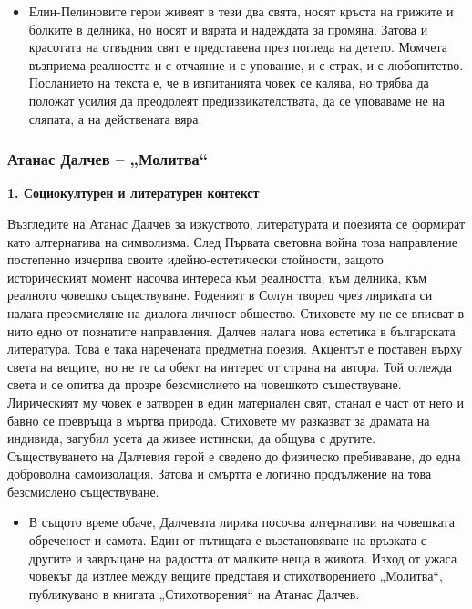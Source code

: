 \documentclass[12pt,a4paper]{article}
\begin{document}
\begin{itemize}[leftmargin=*]
\vspace{-0.65cm}
\item Елин-Пелиновите герои живеят в тези два свята, носят кръста на грижите и болките в делника, но носят и вярата и надеждата за промяна. Затова и красотата на отвъдния свят е представена през погледа на детето. Момчета възприема реалността и с отчаяние и с упование, и с страх, и с любопитство. Посланието на текста е, че в изпитанията човек се калява, но трябва да положат усилия да преодолеят предизвикателствата, да се уповаваме не на сляпата, а на действената вяра.
\end{itemize}

\newpage

\subsubsection{\colorbox{green!40}{Атанас Далчев – „Молитва“}}

\textbf{1. Социокултурен и литературен контекст}
\vspace{0.1cm}
 
\indent Възгледите на Атанас Далчев за изкуството, литературата и поезията се формират като алтернатива на символизма. След Първата световна война това направление постепенно изчерпва своите идейно-естетически стойности, защото историческият момент насочва интереса към реалността, към делника, към реалното човешко съществуване. Роденият в Солун творец чрез лириката си налага преосмисляне на диалога личност-общество. Стиховете му не се вписват в нито едно от познатите направления. Далчев налага нова естетика в българската литература. Това е така наречената предметна поезия. Акцентът е поставен върху света на вещите, но не те са обект на интерес от страна на автора. Той оглежда света и се опитва да прозре безсмислието на човешкото съществуване. Лирическият му човек е затворен в един материален свят, станал е част от него и бавно се превръща в мъртва природа. Стиховете му разказват за драмата на индивида, загубил усета да живее истински, да общува с другите. Съществуването на Далчевия герой е сведено до физическо пребиваване, до една доброволна самоизолация. Затова и смъртта е логично продължение на това безсмислено съществуване.

\begin{itemize}[leftmargin=*]
\vspace{-0.2cm}
\item В същото време обаче, Далчевата лирика посочва алтернативи на човешката обреченост и самота. Един от пътищата е възстановяване на връзката с другите и завръщане на радостта от малките неща в живота. Изход от ужаса човекът да изтлее между вещите представя и стихотворението „Молитва“, публикувано в книгата „Стихотворения“ на Атанас Далчев.
\end{itemize}
 
\end{document}
